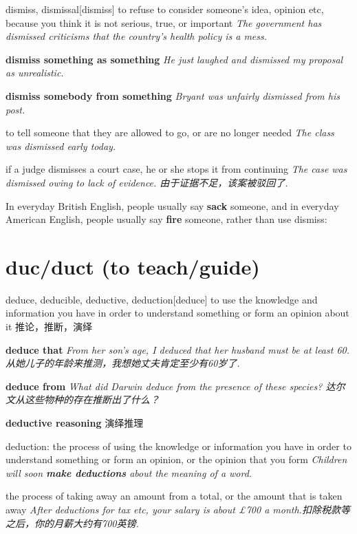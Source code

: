 \begin{DefWord}{dismiss, dismissal}[dismiss]
    to refuse to consider someone’s idea, opinion etc, because you think it is not serious, true, or important
    \textit{The government has dismissed criticisms that the country’s health policy is a mess.}

    \textbf{dismiss something as something}
    \textit{He just laughed and dismissed my proposal as unrealistic.}

    \textbf{dismiss somebody from something}
    \textit{ Bryant was unfairly dismissed from his post.}

    to tell someone that they are allowed to go, or are no longer needed
    \textit{The class was dismissed early today.}

    if a judge dismisses a court case, he or she stops it from continuing
    \textit{The case was dismissed owing to lack of evidence. 由于证据不足，该案被驳回了. }
\end{DefWord}

\begin{remark}
    In everyday British English, people usually say \textbf{sack} someone, and in everyday American English, people usually say \textbf{fire} someone, rather than use dismiss:
\end{remark}

\section{duc/duct (to teach/guide)}

\begin{DefWord}{deduce, deducible, deductive, deduction}[deduce]
    to use the knowledge and information you have in order to understand something or form an opinion about it 推论，推断，演绎

    \textbf{deduce that}
    \textit{From her son’s age, I deduced that her husband must be at least 60. 从她儿子的年龄来推测，我想她丈夫肯定至少有60岁了. }

    \textbf{deduce from}
    \textit{What did Darwin deduce from the presence of these species? 达尔文从这些物种的存在推断出了什么？}

    \textbf{deductive reasoning} 演绎推理

    deduction: the process of using the knowledge or information you have in order to understand something or form an opinion, or the opinion that you form
    \textit{Children will soon \textbf{make deductions} about the meaning of a word.}

    the process of taking away an amount from a total, or the amount that is taken away
    \textit{After deductions for tax etc, your salary is about £700 a month.扣除税款等之后，你的月薪大约有700英镑. }
\end{DefWord}

